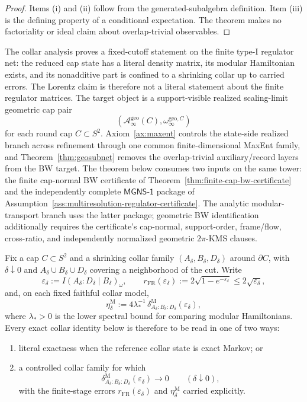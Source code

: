 \documentclass[11pt]{article}
\begin{document}
\begin{proof}
Items \textup{(i)} and \textup{(ii)} follow from the generated-subalgebra definition. Item
\textup{(iii)} is the defining property of a conditional expectation. The theorem makes no
factoriality or ideal claim about overlap-trivial observables.
\end{proof}

The collar analysis proves a fixed-cutoff statement on the finite type-I regulator net: the reduced cap state has a literal density matrix, its modular Hamiltonian exists, and its nonadditive part is confined to a shrinking collar up to carried errors. The Lorentz claim is therefore not a literal statement about the finite regulator matrices. The target object is a support-visible realized scaling-limit geometric cap pair
\[
(\mathcal A_\infty^{\mathrm{geo}}(C),\omega_\infty^{\mathrm{geo},C})
\]
for each round cap \(C\subset S^2\). Axiom~\ref{ax:maxent} controls the state-side realized branch across refinement through one common finite-dimensional MaxEnt family, and Theorem~\ref{thm:geosubnet} removes the overlap-trivial auxiliary/record layers from the BW target. The theorem below consumes two inputs on the same tower: the finite cap-normal BW certificate of Theorem~\ref{thm:finite-cap-bw-certificate} and the independently complete \(\mathsf{MGNS\text{-}1}\) package of Assumption~\ref{ass:multiresolution-regulator-certificate}. The analytic modular-transport branch uses the latter package; geometric BW identification additionally requires the certificate's cap-normal, support-order, frame/flow, cross-ratio, and independently normalized geometric \(2\pi\)-KMS clauses.

Fix a cap \(C\subset S^2\) and a shrinking collar family \((A_\delta,B_\delta,D_\delta)\) around \(\partial C\), with \(\delta\downarrow 0\) and \(A_\delta\cup B_\delta\cup D_\delta\) covering a neighborhood of the cut. Write
\[
\varepsilon_\delta:=I(A_\delta:D_\delta\mid B_\delta)_\omega,
\qquad
r_{\mathrm{FR}}(\varepsilon_\delta):=
2\sqrt{1-e^{-\varepsilon_\delta}}
\le 2\sqrt{\varepsilon_\delta},
\]
and, on each fixed faithful collar model,
\[
\eta_\delta^{\mathrm M}
:=
4\lambda_\ast^{-1}\,
\delta^{\mathrm M}_{A_\delta:B_\delta:D_\delta}(\varepsilon_\delta),
\]
where \(\lambda_\ast>0\) is the lower spectral bound for comparing modular Hamiltonians. Every exact collar identity below is therefore to be read in one of two ways:
\begin{enumerate}[leftmargin=2em]
\item literal exactness when the reference collar state is exact Markov; or
\item a controlled collar family for which
\[
\delta^{\mathrm M}_{A_\delta:B_\delta:D_\delta}(\varepsilon_\delta)\to 0
\qquad(\delta\downarrow 0),
\]
with the finite-stage errors \(r_{\mathrm{FR}}(\varepsilon_\delta)\) and \(\eta_\delta^{\mathrm M}\) carried explicitly.
\end{enumerate}
\end{document}
